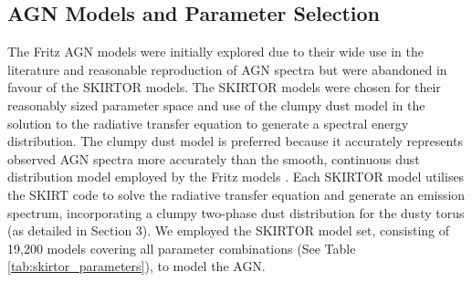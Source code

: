 \subsection{AGN Models and Parameter Selection}
  The Fritz AGN models were initially explored due to their wide use in the literature and reasonable reproduction of AGN spectra but were abandoned in favour of the SKIRTOR models. The SKIRTOR models were chosen for their reasonably sized parameter space and use of the clumpy dust model in the solution to the radiative transfer equation to generate a spectral energy distribution. The clumpy dust model is preferred because it accurately represents observed AGN spectra more accurately than the smooth, continuous dust distribution model employed by the Fritz models \citep{gonzalez-martin_role_2023}. Each SKIRTOR model utilises the SKIRT code \citep{camps_skirt_2015} to solve the radiative transfer equation and generate an emission spectrum, incorporating a clumpy two-phase dust distribution for the dusty torus (as detailed in Section 3). We employed the SKIRTOR model set, consisting of 19,200 models covering all parameter combinations (See Table \ref{tab:skirtor_parameters}), to model the AGN.  
